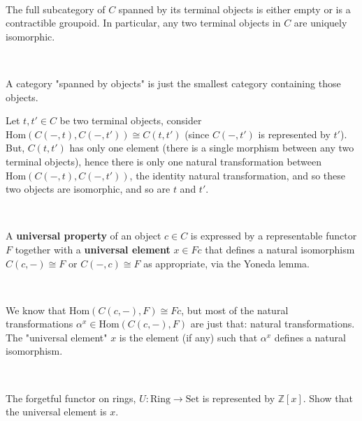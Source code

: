 \documentclass{article}
\begin{document}
\begin{corollary}
\

The full subcategory of $C$ spanned by its terminal objects is either empty or is a contractible groupoid. In particular, any two terminal objects in $C$ are uniquely isomorphic.
\end{corollary}

\begin{customproof}
\

A category "spanned by objects" is just the smallest category containing those objects. 

Let $t, t' \in C$ be two terminal objects, consider $\text{Hom}(C(-,t), C(-,t')) \cong C(t,t')$ (since $C(-,t')$ is represented by $t'$). But, $C(t,t')$ has only one element (there is a single morphism between any two terminal objects), hence there is only one natural transformation between $\text{Hom}(C(-,t), C(-,t'))$, the identity natural transformation, and so these two objects are isomorphic, and so are $t$ and $t'$.
\end{customproof}

\begin{definition}
\

A \textbf{universal property} of an object $c \in C$ is expressed by a representable functor $F$ together with a \textbf{universal element} $x \in Fc$ that defines a natural isomorphism $C(c,-) \cong F$ or $C(-,c) \cong F$ as appropriate, via the Yoneda lemma.  
\end{definition}

\begin{remark}
\

We know that $\text{Hom}(C(c,-), F) \cong Fc$, but most of the natural transformations $\alpha^x \in \text{Hom}(C(c,-), F)$ are just that: natural transformations. The "universal element" $x$ is the element (if any) such that $\alpha^x$ defines a natural isomorphism.
\end{remark}

\begin{proposition}
\

The forgetful functor on rings, $U: \text{Ring} \to \text{Set}$ is represented by $\mathbb{Z}[x]$. Show that the universal element is $x$.
\end{proposition}
\end{document}
